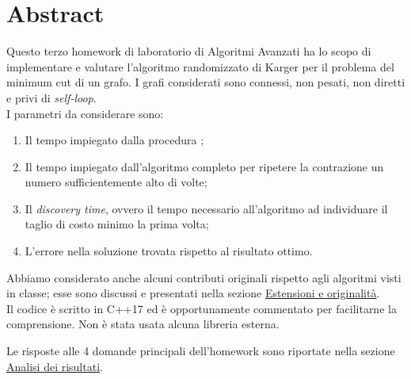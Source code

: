 \section{Abstract}
\label{cap:abstract}

Questo terzo homework di laboratorio di Algoritmi Avanzati ha lo scopo di implementare e valutare l'algoritmo randomizzato di Karger per il problema del minimum cut di un grafo. I grafi considerati sono connessi, non pesati, non diretti e privi di \textit{self-loop}. \\

\noindent I parametri da considerare sono:

\begin{enumerate}
    \item Il tempo impiegato dalla procedura ;
    \item Il tempo impiegato dall'algoritmo completo per ripetere la contrazione un numero sufficientemente alto di volte;
    \item Il \textit{discovery time}, ovvero il tempo necessario all'algoritmo ad individuare il taglio di costo minimo la prima volta;
    \item L'errore nella soluzione trovata rispetto al risultato ottimo.
\end{enumerate}

\noindent Abbiamo considerato anche alcuni contributi originali rispetto agli algoritmi visti in classe; esse sono discussi e presentati nella sezione \hyperref[cap:extensions-and-originalities]{Estensioni e originalità}. \\

\noindent Il codice è scritto in C++17 ed è opportunamente commentato per facilitarne la comprensione. Non è stata usata alcuna libreria esterna.

\noindent Le risposte alle 4 domande principali dell'homework sono riportate nella sezione \hyperref[cap:performance-analysis]{Analisi dei risultati}.
